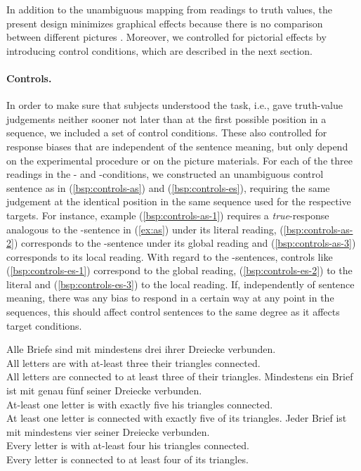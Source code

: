 \documentclass[fleqn,reqno,10pt,draft]{article}
\newcommand{\as}{\acro{as}}
\renewcommand{\es}{\acro{es}}
\begin{document}
In addition to the unambiguous mapping from readings to truth values,
the present design minimizes graphical effects because there is no
comparison between different pictures
\citep[c.f.][]{Tielvan-Tiel2012:Embedded-Scalar}. Moreover, we
controlled for pictorial effects by introducing control conditions,
which are described in the next section.


\paragraph{Controls.} In order to make sure that subjects understood
the task, i.e., gave truth-value judgements neither sooner not later
than at the first possible position in a sequence, we included a set
of control conditions. These also controlled for response biases that
are independent of the sentence meaning, but only depend on the
experimental procedure or on the picture materials. For each of the
three readings in the \as- and \es-conditions, we constructed an
unambiguous control sentence as in (\ref{bsp:controls-as}) and
(\ref{bsp:controls-es}), requiring the same judgement at the identical
position in the same sequence used for the respective targets. For
instance, example (\ref{bsp:controls-as-1}) requires a
\emph{true}-response analogous to the \as-sentence in (\ref{ex:as})
under its literal reading, (\ref{bsp:controls-as-2}) corresponds to
the \as-sentence under its global reading and
(\ref{bsp:controls-as-3}) corresponds to its local reading. With
regard to the \es-sentences, controls like (\ref{bsp:controls-es-1})
correspond to the global reading, (\ref{bsp:controls-es-2}) to the
literal and (\ref{bsp:controls-es-3}) to the local reading. If,
independently of sentence meaning, there was any bias to respond in a
certain way at any point in the sequences, this should affect control
sentences to the same degree as it affects target conditions.

\begin{exe}
  \ex \label{bsp:controls-as}
    \begin{xlist}
\ex \label{bsp:controls-as-1} \gll Alle Briefe sind mit mindestens drei ihrer Dreiecke verbunden.\\
  All letters are with at-least three their triangles connected.\\
  \trans All letters are connected to at least three of their triangles.
\ex \label{bsp:controls-as-2} \gll Mindestens ein Brief ist mit genau f\"unf seiner Dreiecke verbunden.\\
  At-least one letter is with exactly five his triangles connected.\\
  \trans At least one letter is connected with exactly five of its triangles.
\ex \label{bsp:controls-as-3} \gll Jeder Brief ist mit mindestens vier seiner Dreiecke verbunden.\\
  Every letter is with at-least four his triangles connected.\\
  \trans Every letter is connected to at least four of its triangles.
\end{xlist}
\end{exe}
\end{document}
